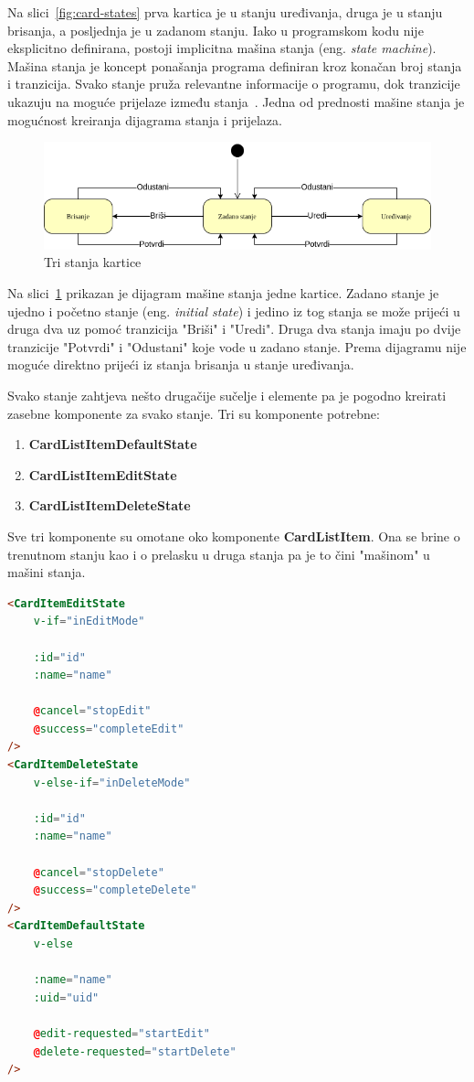 Na slici~\ref{fig:card-states} prva kartica je u stanju uređivanja, druga je u stanju brisanja, a posljednja je u zadanom
stanju.
Iako u programskom kodu nije eksplicitno definirana, postoji implicitna mašina stanja (eng. \textit{state machine}).
Mašina stanja je koncept ponašanja programa definiran kroz konačan broj stanja i tranzicija.
Svako stanje pruža relevantne informacije o programu, dok tranzicije ukazuju na moguće prijelaze između stanja~\cite{state-machine}.
Jedna od prednosti mašine stanja je mogućnost kreiranja dijagrama stanja i prijelaza.

\begin{figure}[h!]
    \centering
    \includegraphics[scale=0.5]{images/card-state-machine}
    \caption{Tri stanja kartice}
    \label{fig:card-state-machine}
\end{figure}

Na slici~\ref{fig:card-state-machine} prikazan je dijagram mašine stanja jedne kartice.
Zadano stanje je ujedno i početno stanje (eng. \textit{initial state}) i jedino iz tog stanja se može prijeći
u druga dva uz pomoć tranzicija "Briši" i "Uredi".
Druga dva stanja imaju po dvije tranzicije "Potvrdi" i "Odustani" koje vode u zadano stanje.
Prema dijagramu nije moguće direktno prijeći iz stanja brisanja u stanje uređivanja.

Svako stanje zahtjeva nešto drugačije sučelje i elemente pa je pogodno kreirati zasebne komponente za svako stanje.
Tri su komponente potrebne:
\begin{enumerate}
    \item \textbf{CardListItemDefaultState}
    \item \textbf{CardListItemEditState}
    \item \textbf{CardListItemDeleteState}
\end{enumerate}

Sve tri komponente su omotane oko komponente \textbf{CardListItem}.
Ona se brine o trenutnom stanju kao i o prelasku u druga stanja pa je to čini "mašinom" u mašini stanja.

\begin{lstlisting}[language=HTML]
<CardItemEditState
    v-if="inEditMode"

    :id="id"
    :name="name"

    @cancel="stopEdit"
    @success="completeEdit"
/>
<CardItemDeleteState
    v-else-if="inDeleteMode"

    :id="id"
    :name="name"

    @cancel="stopDelete"
    @success="completeDelete"
/>
<CardItemDefaultState
    v-else

    :name="name"
    :uid="uid"

    @edit-requested="startEdit"
    @delete-requested="startDelete"
/>
\end{lstlisting}

